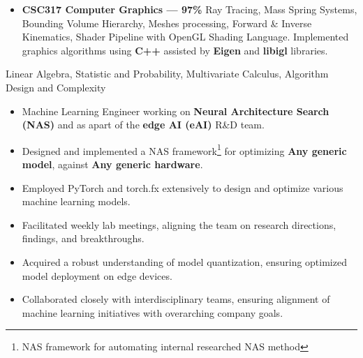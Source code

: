 \documentclass[10pt,a4paper,ragged2e,withhyper]{altacv}
\begin{document}
\begin{paracol}{2}
\begin{itemize}
    \item  \textbf{CSC317 Computer Graphics --- 97\%}
    Ray Tracing, Mass Spring Systems, Bounding Volume Hierarchy, Meshes processing, Forward \& Inverse Kinematics, Shader Pipeline with OpenGL Shading Language. Implemented graphics algorithms using \textbf{C++} assisted by \textbf{Eigen} and 
    \textbf{libigl} libraries. 

\end{itemize}
\vspace{-5pt}
\vspace{-5pt}
Linear Algebra, Statistic and Probability, Multivariate Calculus, Algorithm Design and Complexity

 

\begin{itemize}
    \item Machine Learning Engineer working on \textbf{Neural Architecture Search (NAS)} and as apart of the \textbf{edge AI (eAI)} R\&D team.

    \item Designed and implemented a NAS framework\footnote*{NAS framework for automating internal researched NAS method} for optimizing \textbf{Any generic model}, against \textbf{Any generic hardware}.
        
    \item Employed PyTorch and torch.fx extensively to design and optimize various machine learning models.

    \item Facilitated weekly lab meetings, aligning the team on research directions, findings, and breakthroughs.

    \item Acquired a robust understanding of model quantization, ensuring optimized model deployment on edge devices.

    \item Collaborated closely with interdisciplinary teams, ensuring alignment of machine learning initiatives with overarching company goals.


\end{itemize}
\end{paracol}
\end{document}
